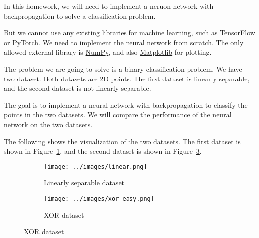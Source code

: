 In this homework, we will need to implement a neruon network with backpropagation to solve a classification problem.

But we cannot use any existing libraries for machine learning, such as TensorFlow or PyTorch. We need to implement the neural network from scratch. The only allowed external library is \href{https://numpy.org/}{NumPy}, and also \href{https://matplotlib.org/}{Matplotlib} for plotting.

The problem we are going to solve is a binary classification problem. We have two dataset. Both datasets are 2D points. The first dataset is linearly separable, and the second dataset is not linearly separable.

The goal is to implement a neural network with backpropagation to classify the points in the two datasets. We will compare the performance of the neural network on the two datasets.

The following shows the visualization of the two datasets. The first dataset is shown in Figure~\ref{fig:dataset1}, and the second dataset is shown in Figure~\ref{fig:dataset2}.

\begin{figure}[H]
    \centering
    \begin{subfigure}[b]{0.45\textwidth}
        \centering
        \texttt{[image: ../images/linear.png]}
        \caption{Linearly separable dataset}
        \label{fig:dataset1}
    \end{subfigure}
    \begin{subfigure}[b]{0.45\textwidth}
        \centering
        \texttt{[image: ../images/xor\_easy.png]}
        \caption{XOR dataset}
        \label{fig:dataset2}
    \end{subfigure}
\end{figure}
